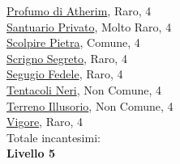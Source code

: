 \begin{multicols}{3}
{{\hyperlink{Profumo di Atherim}{Profumo di Atherim}, Raro, 4\\
\hyperlink{Santuario Privato}{Santuario Privato}, Molto Raro, 4\\
\hyperlink{Scolpire Pietra}{Scolpire Pietra}, Comune, 4\\
\hyperlink{Scrigno Segreto}{Scrigno Segreto}, Raro, 4\\
\hyperlink{Segugio Fedele}{Segugio Fedele}, Raro, 4\\
\hyperlink{Tentacoli Neri}{Tentacoli Neri}, Non Comune, 4\\
\hyperlink{Terreno Illusorio}{Terreno Illusorio}, Non Comune, 4\\
\hyperlink{Vigore}{Vigore}, Raro, 4\\

\medskip Totale incantesimi: \theinclvquattro\\

\textbf{Livello 5} 

}}
\end{multicols}
